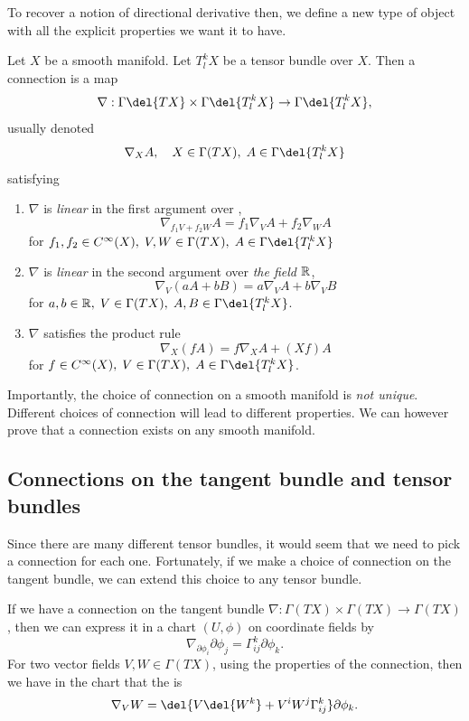 To recover a notion of directional derivative then, we define a new type of object with all the explicit properties we want it to have.
\begin{definition}
	\label{def:connection}
	Let \(X\) be a smooth manifold. Let \(T^k_lX\) be a tensor bundle over \(X\). Then a connection is a map 
	\[
		\nabla: \Gamma\del{TX}\times \Gamma\del{T^k_lX} \to \Gamma\del{T^k_lX}
	,\] 
	usually denoted 
	\[\nabla_X A, \quad X\in \Gamma(TX), \; A\in \Gamma\del{T^k_lX}\]
	satisfying
	\begin{enumerate}
		\item \(\nabla\) is \emph{linear} in the first argument over ,
		\[\nabla_{f_1 V + f_2 W}A = f_1 \nabla_V A + f_2 \nabla_W A\]
		for \(f_1, f_2 \in C^\infty(X), \;V,W\in\Gamma(TX),\; A\in \Gamma\del{T^k_l X}\)
		\item \(\nabla\) is \emph{linear} in the second argument over \emph{the field \(\mathbb{R}\)},
		\[\nabla_{V}(aA + bB) = a \nabla_V A + b \nabla_V B\]
		for \(a, b \in \R, \;V\in\Gamma(TX),\; A,B\in \Gamma\del{T^k_l X}\).
		\item \(\nabla\) satisfies the product rule
		\[\nabla_X(fA) = f\nabla_X A + (Xf)A\]
		for \(f \in C^\infty(X),\;V\in\Gamma(TX),\; A\in \Gamma\del{T^k_l X}\).
	\end{enumerate}
\end{definition}
Importantly, the choice of connection on a smooth manifold is \emph{not unique}.
Different choices of connection will lead to different properties.
We can however prove that a connection exists on any smooth manifold.

\subsection{Connections on the tangent bundle and tensor bundles}
Since there are many different tensor bundles, it would seem that we need to pick a connection for each one.
Fortunately, if we make a choice of connection on the tangent bundle, we can extend this choice to any tensor bundle.

If we have a connection on the tangent bundle \(\nabla: \Gamma(TX) \times \Gamma(TX) \to \Gamma(TX)\), then we can express it in a chart \((U, \phi)\) on coordinate fields by 
\[\nabla_{\partial\phi_i} \partial\phi_j = \Gamma_{ij}^k \partial\phi_k.\]
For two vector fields \(V, W\in \Gamma(TX)\), using the properties of the connection, then we have in the chart that the  is
\[\nabla_V W = \del{V\del{W^k} + V^i W^j \Gamma_{ij}^k} \partial\phi_k .\]

